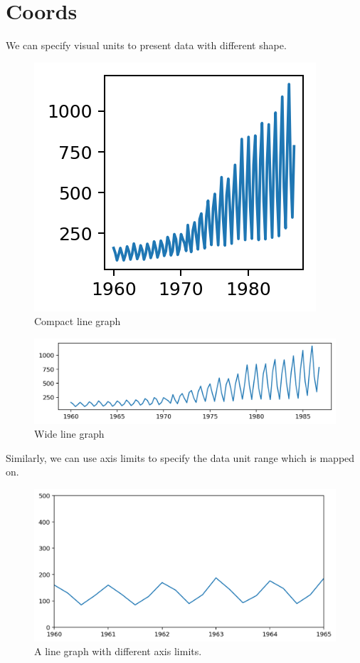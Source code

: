 \documentclass[a4paper, openany]{memoir}
\begin{document}
\section{Coords}
We can specify visual units to present data with different shape. 
\begin{figure}[H]
    \centering
    \includegraphics[scale=0.6]{src/2.53 compact line graph.png}
    \caption{Compact line graph}
\end{figure}
\begin{figure}[H]
    \centering
    \includegraphics[scale=0.6]{src/2.54 wide line graph.png}
    \caption{Wide line graph}
\end{figure}
\noindent Similarly, we can use axis limits to specify the data unit range which is mapped on. 
\begin{figure}[H]
    \centering
    \includegraphics[scale=0.6]{src/2.55 axis limits.png}
    \caption{A line graph with different axis limits.}    
\end{figure}
\end{document}
